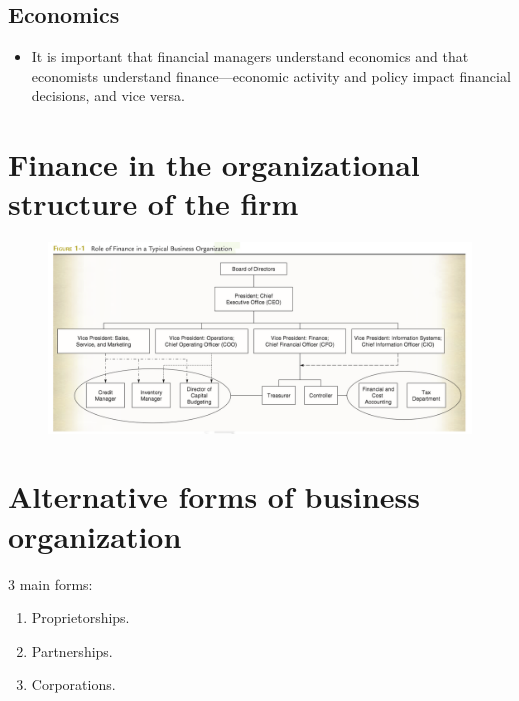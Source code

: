 \documentclass{article}
\begin{document}
\subsection{Economics}
\begin{itemize}
    \item It is important that financial managers understand economics and that economists understand finance—economic activity and policy impact financial decisions, and vice versa.
\end{itemize}

\section{Finance in the organizational structure of the firm}
\begin{figure}[H]
    \centering
    \includegraphics[width=\textwidth]{structure} 
\end{figure}


\section{Alternative forms of business organization}
3 main forms: 
\begin{enumerate}
    \item Proprietorships.
    \item Partnerships.
    \item Corporations.
\end{enumerate}
\end{document}
